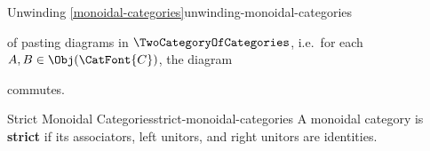\begin{remark}{Unwinding \cref{monoidal-categories}}{unwinding-monoidal-categories}
\begin{enumerate}
\begin{scalemath}
            \end{scalemath}
            of pasting diagrams in $\TwoCategoryOfCategories$, i.e.\ for each $A,B\in\Obj(\CatFont{C})$, the diagram
            \begin{webcompile}
            \end{webcompile}
            commutes.
    \end{enumerate}
\end{remark}
\begin{definition}{Strict Monoidal Categories}{strict-monoidal-categories}%
    A monoidal category is \textbf{strict} if its associators, left unitors, and right unitors are identities.
\end{definition}
